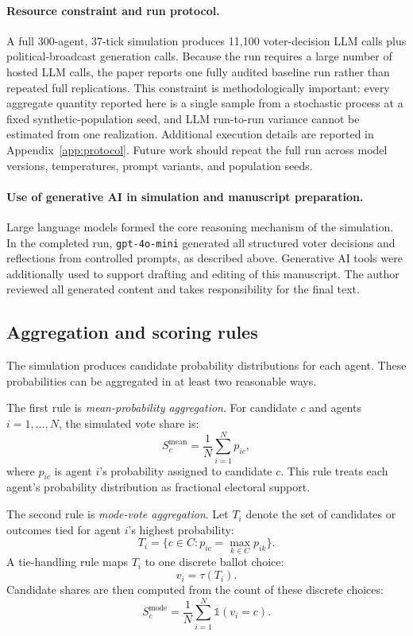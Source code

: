 \documentclass[pdflatex,sn-mathphys-num,iicol]{sn-jnl}
\begin{document}
\paragraph{Resource constraint and run protocol.}
A full 300-agent, 37-tick simulation produces 11{,}100 voter-decision LLM calls
plus political-broadcast generation calls. Because the run requires a large
number of hosted LLM calls, the paper reports one fully audited baseline run
rather than repeated full replications. This constraint is methodologically
important: every aggregate quantity reported here is a single sample from a
stochastic process at a fixed synthetic-population seed, and LLM run-to-run
variance cannot be estimated from one realization. Additional execution details
are reported in Appendix~\ref{app:protocol}. Future work should repeat the full
run across model versions, temperatures, prompt variants, and population seeds.

\paragraph{Use of generative AI in simulation and manuscript preparation.}
Large language models formed the core reasoning mechanism of the simulation.
In the completed run, \texttt{gpt-4o-mini} generated all structured voter
decisions and reflections from controlled prompts, as described above. Generative
AI tools were additionally used to support drafting and editing of this
manuscript. The author reviewed all generated content and takes responsibility
for the final text.

\subsection{Aggregation and scoring rules}\label{subsec:aggregation}

The simulation produces candidate probability distributions for each agent.
These probabilities can be aggregated in at least two reasonable ways.

The first rule is \textit{mean-probability aggregation}. For candidate $c$ and
agents $i=1,\ldots,N$, the simulated vote share is:
\begin{equation}
S_c^{\text{mean}} = \frac{1}{N}\sum_{i=1}^{N}p_{ic},
\end{equation}
where $p_{ic}$ is agent $i$'s probability assigned to candidate $c$. This rule
treats each agent's probability distribution as fractional electoral support.

The second rule is \textit{mode-vote aggregation}. Let $T_i$ denote the set of
candidates or outcomes tied for agent $i$'s highest probability:
\begin{equation}
T_i = \{c \in C : p_{ic} = \max_{k \in C} p_{ik}\}.
\end{equation}
A tie-handling rule maps $T_i$ to one discrete ballot choice:
\begin{equation}
v_i = \tau(T_i).
\end{equation}
Candidate shares are then computed from the count of these discrete choices:
\begin{equation}
S_c^{\text{mode}} = \frac{1}{N}\sum_{i=1}^{N}\mathbb{1}(v_i=c).
\end{equation}
\end{document}
